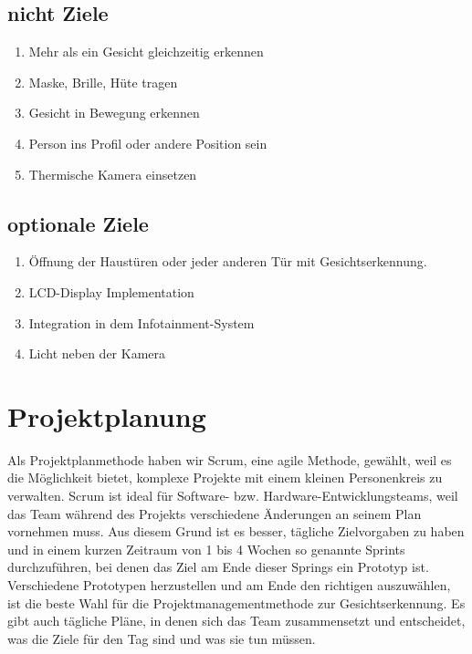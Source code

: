 \subsection{nicht Ziele}
\begin{enumerate}
	\item Mehr als ein Gesicht gleichzeitig erkennen
	
	\item Maske, Brille, Hüte tragen 
	
	\item Gesicht in Bewegung erkennen 
	
	\item Person ins Profil oder andere Position sein
	
	\item Thermische Kamera einsetzen
	
	
\end{enumerate}
\subsection{optionale Ziele}
\begin{enumerate}
	
	
	\item Öffnung der Haustüren oder jeder anderen Tür mit Gesichtserkennung.
	
	\item LCD-Display Implementation
	
	\item Integration in dem Infotainment-System
	
	\item Licht neben der Kamera 
\end{enumerate}
\section{Projektplanung}
Als Projektplanmethode haben wir Scrum, eine agile Methode, gewählt, weil es die Möglichkeit bietet, komplexe Projekte mit einem kleinen Personenkreis zu verwalten. Scrum ist ideal für Software- bzw. Hardware-Entwicklungsteams, weil das Team während des Projekts verschiedene Änderungen an seinem Plan vornehmen muss. Aus diesem Grund ist es besser, tägliche Zielvorgaben zu haben und in einem kurzen Zeitraum von 1 bis 4 Wochen so genannte Sprints durchzuführen, bei denen das Ziel am Ende dieser Springs ein Prototyp ist. Verschiedene Prototypen herzustellen und am Ende den richtigen auszuwählen, ist die beste Wahl für die Projektmanagementmethode zur Gesichtserkennung. Es gibt auch tägliche Pläne, in denen sich das Team zusammensetzt und entscheidet, was die Ziele für den Tag sind und was sie tun müssen. 

